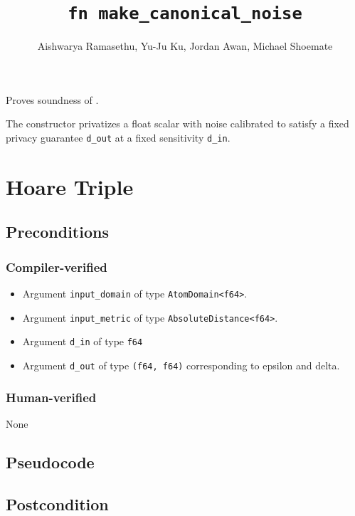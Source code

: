 \documentclass{article}
\title{\texttt{fn make\_canonical\_noise}}
\author{Aishwarya Ramasethu, Yu-Ju Ku, Jordan Awan, Michael Shoemate}
\begin{document}
\maketitle

Proves soundness of .

The constructor privatizes a float scalar with noise calibrated to satisfy 
a fixed privacy guarantee \texttt{d\_out} at a fixed sensitivity \texttt{d\_in}.

\section{Hoare Triple}

\subsection*{Preconditions}
\subsubsection*{Compiler-verified}
\begin{itemize}
    \item Argument \texttt{input\_domain} of type \texttt{AtomDomain<f64>}.
    \item Argument \texttt{input\_metric} of type \texttt{AbsoluteDistance<f64>}.
    \item Argument \texttt{d\_in} of type \texttt{f64}
    \item Argument \texttt{d\_out} of type \texttt{(f64, f64)} corresponding to epsilon and delta.
\end{itemize}

\subsubsection*{Human-verified}
None

\subsection*{Pseudocode}



\subsection*{Postcondition}
\end{document}
